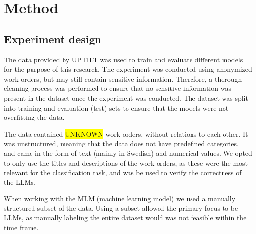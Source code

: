 \section{Method}
%
%
%

\subsection{Experiment design}
%
%
%
%
The data provided by UPTILT was used to train and evaluate different models for the
purpose of this research. The experiment was conducted using anonymized work
orders, but may still contain sensitive information. Therefore, a thorough cleaning
process was performed to ensure that no sensitive information was present in the
dataset once the experiment was conducted. The dataset was split into training
and evaluation (test) sets to ensure that the models were not overfitting the
data.

The data contained \colorbox{yellow}{UNKNOWN} work orders, without relations to each
other. It was unstructured, meaning that the data does not have predefined categories,
and came in the form of text (mainly in Swedish) and numerical values. We opted to
only use the titles and descriptions of the work orders, as these were the most
relevant for the classification task, and was be used to verify the correctness of
the LLMs.

When working with the MLM (machine learning model) we used a manually structured
subset of the data. Using a subset allowed the primary focus to be LLMs, as manually
labeling the entire dataset would was not feasible within the time frame.

